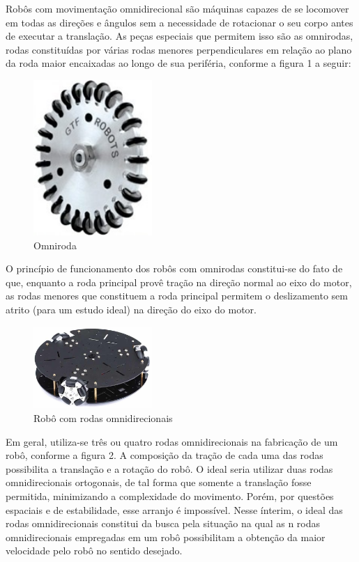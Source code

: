 \documentclass{article}
\begin{document}
Robôs com movimentação omnidirecional são máquinas capazes de se locomover em todas as direções e ângulos sem a necessidade de rotacionar o seu corpo antes de executar a translação. As peças especiais que permitem isso são as omnirodas, rodas constituídas por várias rodas menores perpendiculares em relação ao plano da roda maior encaixadas ao longo de sua periféria, conforme a figura 1 a seguir:

\begin{figure}[H]
\centering
\includegraphics[width=0.4\textwidth]{omniroda.jpeg}
\caption{Omniroda}
\label{Rotulo}
\end{figure}

O princípio de funcionamento dos robôs com omnirodas constitui-se do fato de que, enquanto a roda principal provê tração na direção normal ao eixo do motor, as rodas menores que constituem a roda principal permitem o deslizamento sem atrito (para um estudo ideal) na direção do eixo do motor.

\begin{figure}[H]
\centering
\includegraphics[width=0.4\textwidth]{robo.jpeg}
\caption{Robô com rodas omnidirecionais}
\label{Rotulo}
\end{figure}


Em geral, utiliza-se três ou quatro rodas omnidirecionais na fabricação de um robô, conforme a figura 2. A composição da tração de cada uma das rodas possibilita a translação e a rotação do robô. O ideal seria utilizar duas rodas omnidirecionais ortogonais, de tal forma que somente a translação fosse permitida, minimizando a complexidade do movimento. Porém, por questões espaciais e de estabilidade, esse arranjo é impossível. 
Nesse ínterim, o ideal das rodas omnidirecionais constitui da busca pela situação na qual as n rodas omnidirecionais empregadas em um robô possibilitam a obtenção da maior velocidade pelo robô no sentido desejado.
\end{document}
